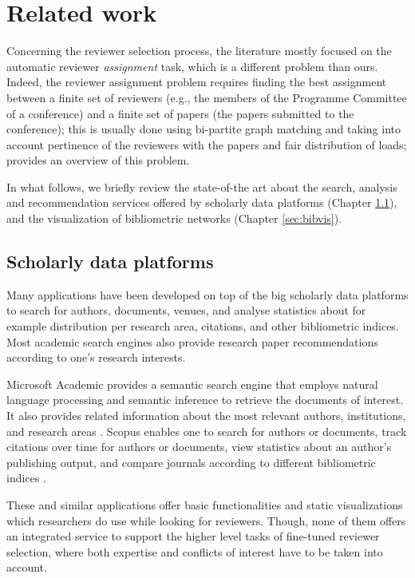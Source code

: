 \chapter{Related work}
\label{sec:related}

Concerning the reviewer selection process, the literature mostly focused on the automatic reviewer \emph{assignment} task, which is a different problem than ours. Indeed, the reviewer assignment problem requires finding the best assignment between a finite set of reviewers (e.g., the members of the Programme Committee of a conference) and a finite set of papers (the papers submitted to the conference); this is usually done using bi-partite graph matching and taking into account pertinence of the reviewers with the papers and fair distribution of loads; \cite{WaCh10} provides an overview of this problem. 

In what follows, we briefly review the state-of-the art about the search, analysis and recommendation services offered by scholarly data platforms (Chapter \ref{sec:schoplat}), and the visualization of bibliometric networks (Chapter \ref{sec:bibvis}). 

\section{Scholarly data platforms}
\label{sec:schoplat}
Many applications have been developed on top of the big scholarly data platforms to search for authors, documents, venues, and analyse statistics about for example distribution per research area, citations, and other bibliometric indices. Most academic search engines also provide research paper recommendations according to one's research interests. 

Microsoft Academic provides a semantic search engine that employs natural language processing and semantic inference to retrieve the documents of interest. It also provides related information about the most relevant authors, institutions, and research areas \cite{SiZh15}. Scopus enables one to search for authors or documents,  track citations over time for authors or documents, view statistics about an author's publishing output, and compare journals according to different bibliometric indices \cite{scopus}. 

These and similar applications offer basic functionalities and static visualizations which researchers do use while looking for reviewers. Though, none of them offers an integrated service to support the higher level tasks of fine-tuned reviewer selection, where both expertise and conflicts of interest have to be taken into account. 

